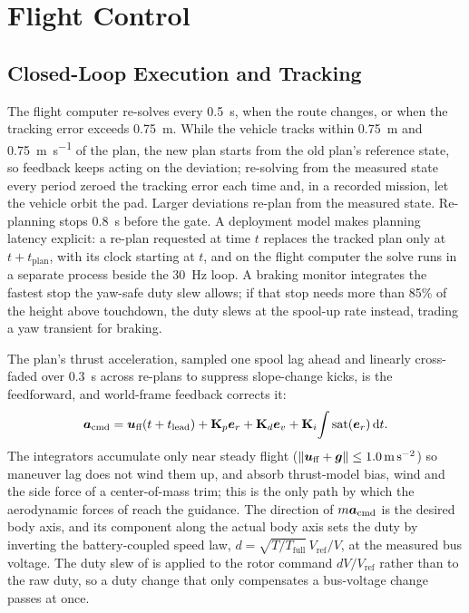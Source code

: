 \documentclass[10pt,letterpaper]{article}
\begin{document}
\section{Flight Control}
\label{sec:control}

\subsection{Closed-Loop Execution and Tracking}
\label{sec:closedloop}

The flight computer re-solves every \SI{0.5}{\second}, when the route changes, or when the tracking error exceeds \SI{0.75}{\metre}.
While the vehicle tracks within \SI{0.75}{\metre} and \SI{0.75}{\metre\per\second} of the plan, the new plan starts from the old plan's reference state, so feedback keeps acting on the deviation; re-solving from the measured state every period zeroed the tracking error each time and, in a recorded mission, let the vehicle orbit the pad.
Larger deviations re-plan from the measured state.
Re-planning stops \SI{0.8}{\second} before the gate.
A deployment model makes planning latency explicit: a re-plan requested at time $t$ replaces the tracked plan only at $t + t_{\text{plan}}$, with its clock starting at $t$, and on the flight computer the solve runs in a separate process beside the \SI{30}{\hertz} loop.
A braking monitor integrates the fastest stop the yaw-safe duty slew allows; if that stop needs more than 85\% of the height above touchdown, the duty slews at the spool-up rate instead, trading a yaw transient for braking.

The plan's thrust acceleration, sampled one spool lag ahead and linearly cross-faded over \SI{0.3}{\second} across re-plans to suppress slope-change kicks, is the feedforward, and world-frame feedback corrects it:
\begin{equation}
\bm{a}_{\text{cmd}} = \bm{u}_{\text{ff}}(t + t_{\text{lead}}) + \mathbf{K}_p\bm{e}_r + \mathbf{K}_d\bm{e}_v + \mathbf{K}_i\!\int\mathrm{sat}(\bm{e}_r)\,\mathrm{d}t .
\label{eq:track}
\end{equation}
The integrators accumulate only near steady flight ($\|\bm{u}_{\text{ff}} + \bm{g}\| \le \SI{1.0}{\metre\per\second\squared}$) so maneuver lag does not wind them up, and absorb thrust-model bias, wind and the side force of a center-of-mass trim; this is the only path by which the aerodynamic forces of  reach the guidance.
The direction of $m\bm{a}_{\text{cmd}}$ is the desired body axis, and its component along the actual body axis sets the duty by inverting the battery-coupled speed law, $d = \sqrt{T/T_{\text{full}}}\,V_{\text{ref}}/V$, at the measured bus voltage.
The duty slew of  is applied to the rotor command $dV/V_{\text{ref}}$ rather than to the raw duty, so a duty change that only compensates a bus-voltage change passes at once.
\end{document}
